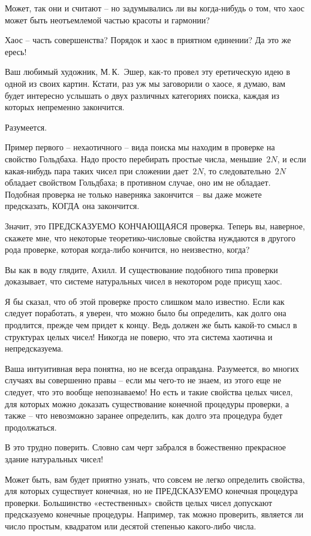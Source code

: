 \documentclass[../main.tex]{subfiles}
\begin{document}
\begin{dialogue}
 Может, так они и считают \--- но задумывались ли вы когда-нибудь о том, что хаос может быть неотъемлемой частью красоты и гармонии?

 Хаос \--- часть совершенства? Порядок и хаос в приятном единении? Да это же ересь!

 Ваш любимый художник, М.\,К.~Эшер, как-то провел эту еретическую идею в одной из своих картин. Кстати, раз уж мы заговорили о хаосе, я думаю, вам будет интересно услышать о двух различных категориях поиска, каждая из которых непременно закончится.

 Разумеется.

 Пример первого \--- нехаотичного \--- вида поиска мы находим в проверке на свойство Гольдбаха. Надо просто перебирать простые числа, меньшие~$2N$, и если какая-нибудь пара таких чисел при сложении дает~$2N$, то следовательно~$2N$ обладает свойством Гольдбаха; в противном случае, оно им не обладает. Подобная проверка не только наверняка закончится \--- вы даже можете предсказать, КОГДА она закончится.

 Значит, это ПРЕДСКАЗУЕМО КОНЧАЮЩАЯСЯ проверка. Теперь вы, наверное, скажете мне, что некоторые теоретико-числовые свойства нуждаются в другого рода проверке, которая когда-либо кончится, но неизвестно, когда?

 Вы как в воду глядите, Ахилл. И существование подобного типа проверки доказывает, что системе натуральных чисел в некотором роде присущ хаос.

 Я бы сказал, что об этой проверке просто слишком мало известно. Если как следует поработать, я уверен, что можно было бы определить, как долго она продлится, прежде чем придет к концу. Ведь должен же быть какой-то смысл в структурах целых чисел! Никогда не поверю, что эта система хаотична и непредсказуема.

 Ваша интуитивная вера понятна, но не всегда оправдана. Разумеется, во многих случаях вы совершенно правы \--- если мы чего-то не знаем, из этого еще не следует, что это вообще непознаваемо! Но есть и такие свойства целых чисел, для которых можно доказать существование конечной процедуры проверки, а также \--- что невозможно заранее определить, как долго эта процедура будет продолжаться.

 В это трудно поверить. Словно сам черт забрался в божественно прекрасное здание натуральных чисел!

 Может быть, вам будет приятно узнать, что совсем не легко определить свойства, для которых существует конечная, но не ПРЕДСКАЗУЕМО конечная процедура проверки. Большинство «естественных» свойств целых чисел допускают предсказуемо конечные процедуры. Например, так можно проверить, является ли число простым, квадратом или десятой степенью какого-либо числа.


\end{dialogue}
\end{document}

